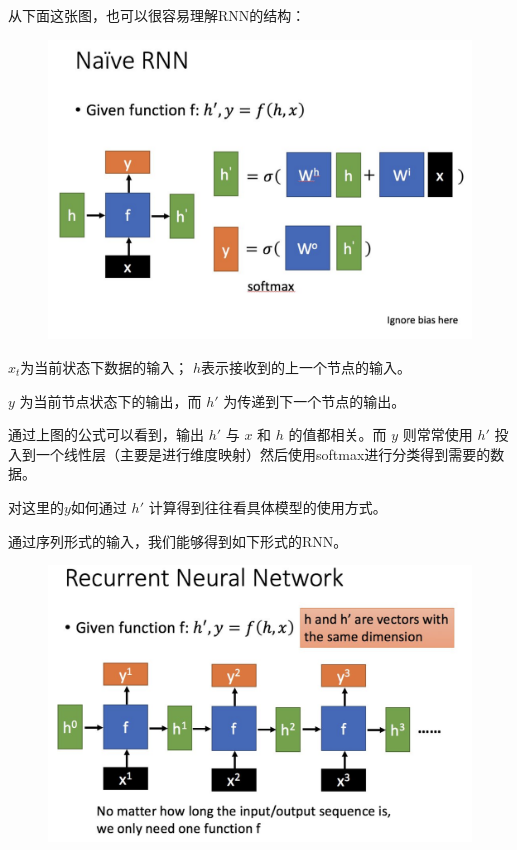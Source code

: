 \documentclass[12pt]{article}
\begin{document}
\begin{framed}
从下面这张图，也可以很容易理解RNN的结构：
\begin{figure}[H]
    \centering
    \includegraphics[width=.6\textwidth]{fig/RNN_Naive_Structure.png}
\end{figure}

$x_t$为当前状态下数据的输入； $h$表示接收到的上一个节点的输入。

$y$ 为当前节点状态下的输出，而 $h'$ 为传递到下一个节点的输出。

通过上图的公式可以看到，输出 $h'$ 与 $x$ 和 $h$ 的值都相关。而 $y$ 则常常使用 $h'$ 投入到一个线性层（主要是进行维度映射）然后使用softmax进行分类得到需要的数据。

对这里的$y$如何通过 $h'$ 计算得到往往看具体模型的使用方式。

通过序列形式的输入，我们能够得到如下形式的RNN。
\begin{figure}[H]
    \centering
    \includegraphics[width=.6\textwidth]{fig/RNN_Naive_Structure_Expand.png}
\end{figure}
\end{framed}
\end{document}
